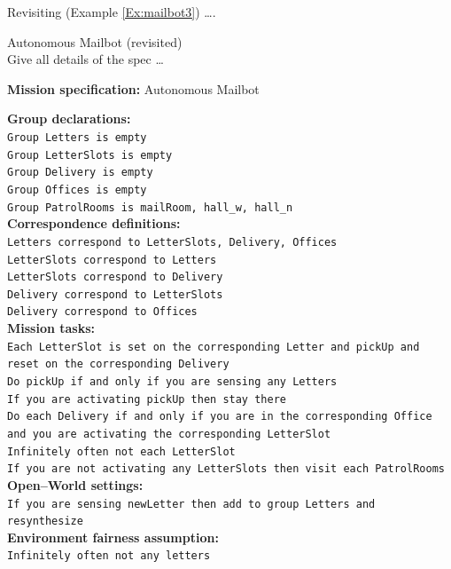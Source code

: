 Revisiting (Example \ref{Ex:mailbot3}) \ldots. 

\begin{myExample}\label{Ex:mailbot3} Autonomous Mailbot (revisited)\\
	Give all details of the spec \ldots
\end{myExample}

\begin{algorithm}
	\textbf{Mission specification:} Autonomous Mailbot\\
	{\small
	
	\textbf{Group declarations:}\\
	\texttt{Group Letters is empty} \\
	\texttt{Group LetterSlots is empty} \\
	\texttt{Group Delivery is empty} \\
	\texttt{Group Offices is empty} \\
	\texttt{Group PatrolRooms is mailRoom, hall\_w, hall\_n}\\ %
	
	\textbf{Correspondence definitions:}\\ %
	\texttt{Letters correspond to LetterSlots, Delivery, Offices}\\ %
	\texttt{LetterSlots correspond to Letters}\\
	\texttt{LetterSlots correspond to Delivery}\\
	\texttt{Delivery correspond to LetterSlots}\\
	\texttt{Delivery correspond to Offices}\\
	
	\textbf{Mission tasks:}\\
	\texttt{Each LetterSlot is set on the corresponding Letter and pickUp and reset on the corresponding Delivery}\\
	
	\texttt{Do pickUp if and only if you are sensing any Letters}\\
	\texttt{If you are activating pickUp then stay there}\\
	
	\texttt{Do each Delivery if and only if you are in the corresponding Office and you are activating the corresponding LetterSlot}\\
	
	\texttt{Infinitely often not each LetterSlot}\\
	\texttt{If you are not activating any LetterSlots then visit each PatrolRooms}\\
	
	\textbf{Open--World settings:}\\
	\texttt{If you are sensing newLetter then add to group Letters and resynthesize}\\
		
	\textbf{Environment fairness assumption:}\\
	\texttt{Infinitely often not any letters}\\
	}
\end{algorithm}

